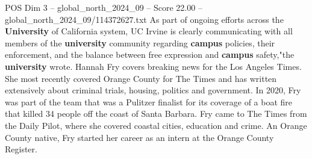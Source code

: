 \begin{textsample}{POS Dim 3 – global\_north\_2024\_09 – Score 22.00 – global\_north\_2024\_09/114372627.txt}
As part of ongoing efforts across the \textbf{University} of California system, UC Irvine is clearly communicating with all members of the \textbf{university} community regarding \textbf{campus} policies, their enforcement, and the balance between free expression and \textbf{campus} safety,"the \textbf{university} wrote.
Hannah Fry covers breaking news for the Los Angeles Times.
She most recently covered Orange County for The Times and has written extensively about criminal trials, housing, politics and government.
In 2020, Fry was part of the team that was a Pulitzer finalist for its coverage of a boat fire that killed 34 people off the coast of Santa Barbara.
Fry came to The Times from the Daily Pilot, where she covered coastal cities, education and crime.
An Orange County native, Fry started her career as an intern at the Orange County Register.

\end{textsample}
